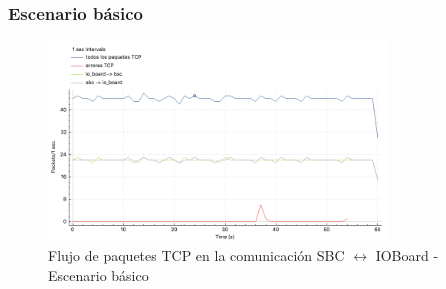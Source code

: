 \documentclass[withindex,glossary]{cam-thesis}
\begin{document}
\subsubsection{Escenario básico}
\begin{figure}[H]
  \centering
  	\includegraphics[width=0.8\textwidth]{images/TCP_Throughput_io_to_pc_basic_pkps}
  	\caption[Throughput de la conexión TCP - Básico]{Flujo de paquetes TCP en la comunicación SBC $\leftrightarrow$ IOBoard -  Escenario básico}
  \label{fig:TCP_Throughput_io_to_pc_basic_pkps}
\end{figure}
\end{document}
